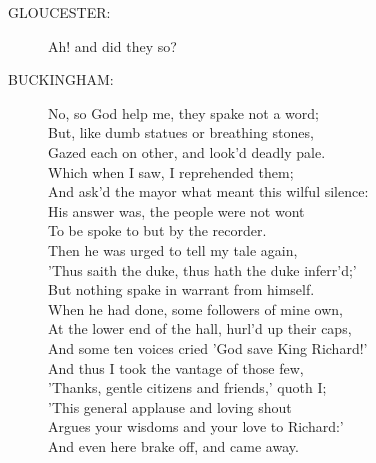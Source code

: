 \documentclass{article}
\begin{document}
\begin{description}
\item[GLOUCESTER:] 
\hspace{1pt}Ah! and did they so?\\
\end{description}
\begin{description}
\item[BUCKINGHAM:] 
\hspace{1pt}No, so God help me, they spake not a word;\\
\hspace{1pt}But, like dumb statues or breathing stones,\\
\hspace{1pt}Gazed each on other, and look'd deadly pale.\\
\hspace{1pt}Which when I saw, I reprehended them;\\
\hspace{1pt}And ask'd the mayor what meant this wilful silence:\\
\hspace{1pt}His answer was, the people were not wont\\
\hspace{1pt}To be spoke to but by the recorder.\\
\hspace{1pt}Then he was urged to tell my tale again,\\
\hspace{1pt}'Thus saith the duke, thus hath the duke inferr'd;'\\
\hspace{1pt}But nothing spake in warrant from himself.\\
\hspace{1pt}When he had done, some followers of mine own,\\
\hspace{1pt}At the lower end of the hall, hurl'd up their caps,\\
\hspace{1pt}And some ten voices cried 'God save King Richard!'\\
\hspace{1pt}And thus I took the vantage of those few,\\
\hspace{1pt}'Thanks, gentle citizens and friends,' quoth I;\\
\hspace{1pt}'This general applause and loving shout\\
\hspace{1pt}Argues your wisdoms and your love to Richard:'\\
\hspace{1pt}And even here brake off, and came away.\\
\end{description}
\end{document}
